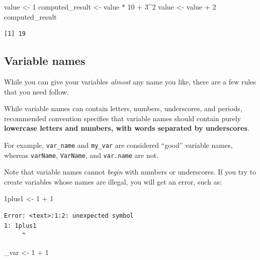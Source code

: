\documentclass[
  letterpaper,
  DIV=11,
  numbers=noendperiod]{scrreprt}
\newenvironment{Shaded}{\begin{snugshade}}{\end{snugshade}}
\newcommand{\DecValTok}[1]{\textcolor[rgb]{0.68,0.00,0.00}{#1}}
\newcommand{\NormalTok}[1]{\textcolor[rgb]{0.00,0.23,0.31}{#1}}
\newcommand{\OtherTok}[1]{\textcolor[rgb]{0.00,0.23,0.31}{#1}}
\newcommand{\SpecialCharTok}[1]{\textcolor[rgb]{0.37,0.37,0.37}{#1}}
\begin{document}
\begin{Shaded}
\begin{Highlighting}[]
\NormalTok{value }\OtherTok{\textless{}{-}} \DecValTok{1}
\NormalTok{computed\_result }\OtherTok{\textless{}{-}}\NormalTok{ value }\SpecialCharTok{*} \DecValTok{10} \SpecialCharTok{+} \DecValTok{3}\SpecialCharTok{\^{}}\DecValTok{2}
\NormalTok{value }\OtherTok{\textless{}{-}}\NormalTok{ value }\SpecialCharTok{+} \DecValTok{2}
\NormalTok{computed\_result }
\end{Highlighting}
\end{Shaded}

\begin{verbatim}
[1] 19
\end{verbatim}

\subsection{Variable names}\label{variable-names}

While you can give your variables \emph{almost} any name you like, there
are a few rules that you need follow.

While variable names can contain letters, numbers, underscores, and
periods, recommended convention specifies that variable names should
contain purely \textbf{lowercase letters and numbers, with words
separated by underscores}.

For example, \texttt{var\_name} and \texttt{my\_var} are considered
``good'' variable names, whereas \texttt{varName}, \texttt{VarName}, and
\texttt{var.name} are not.

Note that variable names cannot \emph{begin} with numbers or
underscores. If you try to create variables whose names are illegal, you
will get an error, such as:

\begin{Shaded}
\begin{Highlighting}[]
\DecValTok{1}\NormalTok{plus1 }\OtherTok{\textless{}{-}} \DecValTok{1} \SpecialCharTok{+} \DecValTok{1}
\end{Highlighting}
\end{Shaded}

\begin{verbatim}
Error: <text>:1:2: unexpected symbol
1: 1plus1
     ^
\end{verbatim}

\begin{Shaded}
\begin{Highlighting}[]
\NormalTok{\_var }\OtherTok{\textless{}{-}} \DecValTok{1} \SpecialCharTok{+} \DecValTok{1}
\end{Highlighting}
\end{Shaded}
\end{document}
